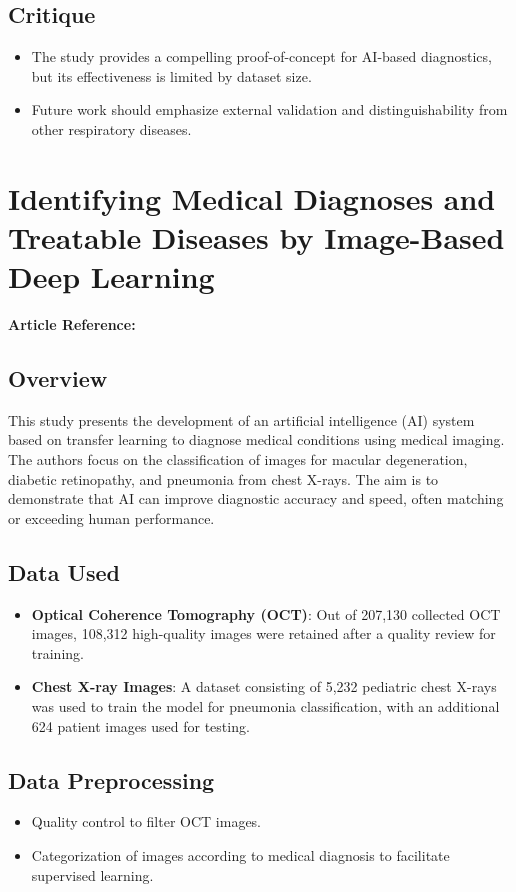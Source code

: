 \subsection*{Critique}
\begin{itemize}
    \item The study provides a compelling proof-of-concept for AI-based diagnostics, but its effectiveness is limited by dataset size.
    \item Future work should emphasize external validation and distinguishability from other respiratory diseases.
\end{itemize}



\section{Identifying Medical Diagnoses and Treatable Diseases by Image-Based Deep Learning}
\textbf{Article Reference:} \cite{article_21}

\subsection*{Overview}
This study presents the development of an artificial intelligence (AI) system based on transfer learning to diagnose medical conditions using medical imaging. The authors focus on the classification of images for macular degeneration, diabetic retinopathy, and pneumonia from chest X-rays. The aim is to demonstrate that AI can improve diagnostic accuracy and speed, often matching or exceeding human performance.

\subsection*{Data Used}
\begin{itemize}
    \item \textbf{Optical Coherence Tomography (OCT)}: Out of 207,130 collected OCT images, 108,312 high-quality images were retained after a quality review for training.
    \item \textbf{Chest X-ray Images}: A dataset consisting of 5,232 pediatric chest X-rays was used to train the model for pneumonia classification, with an additional 624 patient images used for testing.
\end{itemize}

\subsection*{Data Preprocessing}
\begin{itemize}
    \item Quality control to filter OCT images.
    \item Categorization of images according to medical diagnosis to facilitate supervised learning.
\end{itemize}

